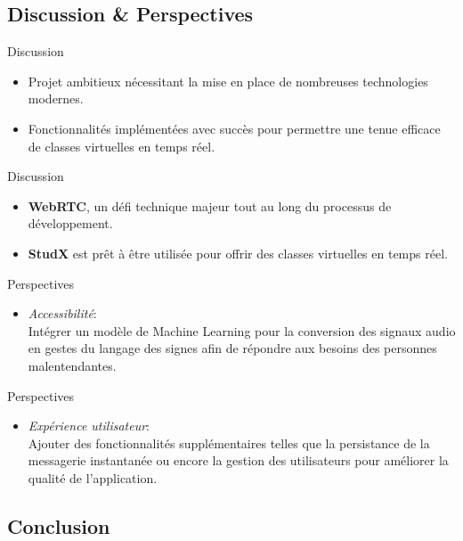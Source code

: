 \documentclass{beamer}
\begin{document}
\begin{frame}
  \begin{center}
    \section{\huge{Discussion \& Perspectives}}
  \end{center}
\end{frame}

\begin{frame}{Discussion}
  \begin{itemize}
    \item Projet ambitieux nécessitant la mise en place de nombreuses technologies modernes.
    \item Fonctionnalités implémentées avec succès pour permettre une tenue efficace de classes virtuelles en temps réel.
    \end{itemize}
\end{frame}

\begin{frame}{Discussion}
  \begin{itemize}
    \item \textbf{WebRTC}, un défi technique majeur tout au long du processus de développement.
    \item \textbf{StudX} est prêt à être utilisée pour offrir des classes virtuelles en temps réel.
  \end{itemize}
\end{frame}

\begin{frame}{Perspectives}
  \begin{itemize}
    \item \textit{Accessibilité}: \\
      Intégrer un modèle de Machine Learning pour la conversion des signaux audio en gestes du langage des signes afin de répondre aux besoins des personnes malentendantes.
  \end{itemize}
\end{frame}

\begin{frame}{Perspectives}
  \begin{itemize}
    \item \textit{Expérience utilisateur}: \\
    Ajouter des fonctionnalités supplémentaires telles que la persistance de la messagerie instantanée ou encore la gestion des utilisateurs pour améliorer la qualité de l'application.
  \end{itemize}
\end{frame}
\begin{frame}
  \begin{center}
    \section{\huge{Conclusion}}
  \end{center}
\end{frame}
\end{document}
